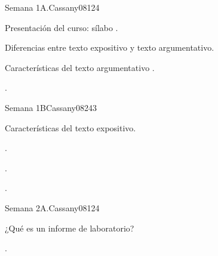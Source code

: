 \begin{syllabus}
\begin{outcomes}
   \item {}
   \item {}
   \item {}
\end{outcomes}

\begin{competences}
    \item {}
    \item {}
    \item {}
\end{competences}

\begin{unit}{}{Semana 1A.}{Cassany08}{12}{4}
   \begin{topics}
      \item Presentación del curso: sílabo .
      \item Diferencias entre texto expositivo y texto argumentativo. 
      \item Características del texto argumentativo .
   \end{topics}
   \begin{learningoutcomes}
      \item . 
   \end{learningoutcomes}
\end{unit}

\begin{unit}{}{Semana 1B}{Cassany08}{24}{3}
   \begin{topics}
      \item Características del texto expositivo.
   \end{topics}

   \begin{learningoutcomes}
      \item . 
      \item .
      \item . 
      \end{learningoutcomes}
\end{unit}

\begin{unit}{}{Semana 2A.}{Cassany08}{12}{4}
   \begin{topics}
      \item ¿Qué es un informe de laboratorio? 
   \end{topics}
   \begin{learningoutcomes}
      \item . 
   \end{learningoutcomes}
\end{unit}


\end{syllabus}
